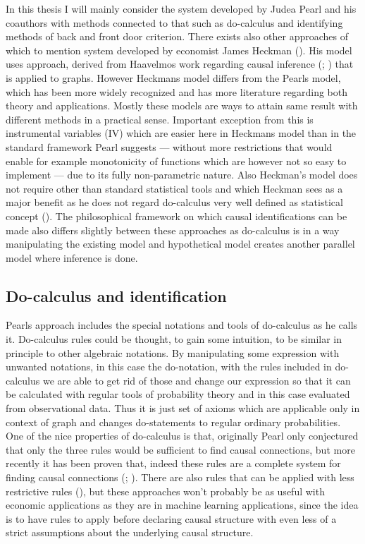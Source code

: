 \documentclass[main=english,12pt,a4paper,pdftex,econ,utf8]{aaltothesis}
\begin{document}


In this thesis I will mainly consider the system developed by Judea Pearl and his coauthors with methods connected to that such as do-calculus and identifying methods of back and front door criterion. There exists also other approaches of which to mention system developed by economist James Heckman (\cite{Heckman2015}). His model uses approach, derived from Haavelmos work regarding causal inference (\cite{Haavelmo1943}; \cite{Haavelmo1944}) that is applied to graphs. However Heckmans model differs from the Pearls model, which has been more widely recognized and has more literature regarding both theory and applications. Mostly these models are ways to attain same result with different methods in a practical sense. Important exception from this is instrumental variables (IV) which are easier here in Heckmans model than in the standard framework Pearl suggests --- without more restrictions that would enable for example monotonicity of functions which are however not so easy to implement --- due to its fully non-parametric nature. Also Heckman's model does not require other than standard statistical tools and which Heckman sees as a major benefit as he does not regard do-calculus very well defined as statistical concept (\cite{Heckman2015}). The philosophical framework on which causal identifications can be made also differs slightly between these approaches as do-calculus is in a way manipulating the existing model and hypothetical model creates another parallel model where inference is done.

\subsection{Do-calculus and identification}

Pearls approach includes the special notations and tools of do-calculus as he calls it. Do-calculus rules could be thought, to gain some intuition, to be similar in principle to other algebraic notations. By manipulating some expression with unwanted notations, in this case the do-notation, with the rules included in do-calculus we are able to get rid of those and change our expression so that it can be calculated with regular tools of probability theory and in this case evaluated from observational data. Thus it is just set of axioms which are applicable only in context of graph and changes do-statements to regular ordinary probabilities. One of the nice properties of do-calculus is that, originally Pearl only conjectured that only the three rules would be sufficient to find causal connections, but more recently it has been proven that, indeed these rules are a complete system for finding causal connections (\cite{Shpitser2006}; \cite{Huang2006a}). There are also rules that can be applied with less restrictive rules (\cite{Hyttinen2015}), but these approaches won't probably be as useful with economic applications as they are in machine learning applications, since the idea is to have rules to apply before declaring causal structure with even less of a strict assumptions about the underlying causal structure.
\end{document}
